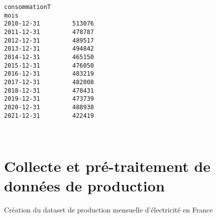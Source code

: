 \documentclass[11pt]{article}
\begin{document}
    \begin{Verbatim}[commandchars=\\\{\}]
            consommationT
mois
2010-12-31         513076
2011-12-31         478787
2012-12-31         489517
2013-12-31         494842
2014-12-31         465150
2015-12-31         476050
2016-12-31         483219
2017-12-31         482008
2018-12-31         478431
2019-12-31         473739
2020-12-31         488938
2021-12-31         422419
    \end{Verbatim}

    \begin{center}
    \end{center}
    { \hspace*{\fill} \\}
    
    \hypertarget{collecte-et-pruxe9-traitement-de-donnuxe9es-de-production}{%
\section{Collecte et pré-traitement de données de
production}\label{collecte-et-pruxe9-traitement-de-donnuxe9es-de-production}}

Création du dataset de production mensuelle d'électricité en France
\end{document}
